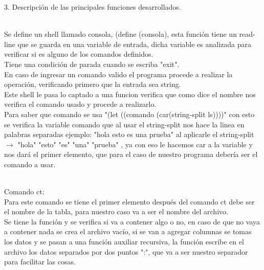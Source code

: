\documentclass[12pt,a4paper]{report}
\begin{document}
\begin{flushleft}
3. Descripción de las principales funciones desarrollados.\\\

Se define un shell llamado consola, (define (consola), esta función tiene un read-line que se guarda en una variable de entrada, dicha variable es analizada
para verificar si es alguno de los comandos definidos.\\
Tiene una condición de parada cuando se escriba "exit".\\
En caso de ingresar un comando valido el programa procede a realizar la operación, verificando primero que la entrada sea string.\\
Este shell le pasa lo captado a una funcion verifica que como dice el nombre nos verifica el comando usado y procede a realizarlo.\\
Para saber que comando se usa "(let ((comando (car(string-split ls))))" con esto se verifica la variable comando que al usar el string-split nos hace la linea
en palabras separadas ejemplo: "hola esto es una prueba"  al aplicarle el string-split $\rightarrow$ "hola" "esto" "es" "una" "prueba" , ya con eso le hacemos car a 
la variable y nos dará el primer elemento, que para el caso de nuestro programa debería ser el comando a usar.\\\

Comando ct:\\
Para este comando se tiene el primer elemento después del comando ct debe ser el nombre de la tabla, para nuestro caso va a ser el nombre del archivo.\\
Se tiene la función y se verifica si va a contener algo o no, en caso de que no vaya a contener nada se crea el archivo vacío, si se van a agregar columnas
se tomas los datos y se pasan a una función auxiliar recursiva, la función escribe en el archivo los datos separados por dos puntos ":", que va a ser nuestro
separador para facilitar las cosas.\\\


\end{flushleft}
\end{document}
